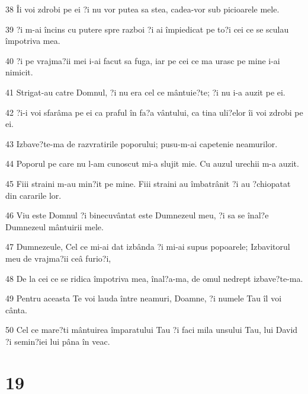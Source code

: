 \par 38 Îi voi zdrobi pe ei ?i nu vor putea sa stea, cadea-vor sub picioarele mele.
\par 39 ?i m-ai încins cu putere spre razboi ?i ai împiedicat pe to?i cei ce se sculau împotriva mea.
\par 40 ?i pe vrajma?ii mei i-ai facut sa fuga, iar pe cei ce ma urasc pe mine i-ai nimicit.
\par 41 Strigat-au catre Domnul, ?i nu era cel ce mântuie?te; ?i nu i-a auzit pe ei.
\par 42 ?i-i voi sfarâma pe ei ca praful în fa?a vântului, ca tina uli?elor îi voi zdrobi pe ei.
\par 43 Izbave?te-ma de razvratirile poporului; pusu-m-ai capetenie neamurilor.
\par 44 Poporul pe care nu l-am cunoscut mi-a slujit mie. Cu auzul urechii m-a auzit.
\par 45 Fiii straini m-au min?it pe mine. Fiii straini au îmbatrânit ?i au ?chiopatat din cararile lor.
\par 46 Viu este Domnul ?i binecuvântat este Dumnezeul meu, ?i sa se înal?e Dumnezeul mântuirii mele.
\par 47 Dumnezeule, Cel ce mi-ai dat izbânda ?i mi-ai supus popoarele; Izbavitorul meu de vrajma?ii ceâ furio?i,
\par 48 De la cei ce se ridica împotriva mea, înal?a-ma, de omul nedrept izbave?te-ma.
\par 49 Pentru aceasta Te voi lauda între neamuri, Doamne, ?i numele Tau îl voi cânta.
\par 50 Cel ce mare?ti mântuirea împaratului Tau ?i faci mila unsului Tau, lui David ?i semin?iei lui pâna în veac.

\chapter{19}

